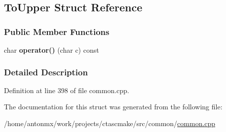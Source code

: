 \hypertarget{structToUpper}{
\subsection{ToUpper Struct Reference}
\label{structToUpper}
}
\subsubsection*{Public Member Functions}
\begin{DoxyCompactItemize}
\item 
\hypertarget{structToUpper_adb7adadb3338c37c6773eb4bf98e7868}{
char {\bfseries operator()} (char c) const }
\label{structToUpper_adb7adadb3338c37c6773eb4bf98e7868}

\end{DoxyCompactItemize}


\subsubsection{Detailed Description}


Definition at line 398 of file common.cpp.



The documentation for this struct was generated from the following file:\begin{DoxyCompactItemize}
\item 
/home/antonmx/work/projects/ctascmake/src/common/\hyperlink{common_8cpp}{common.cpp}\end{DoxyCompactItemize}
